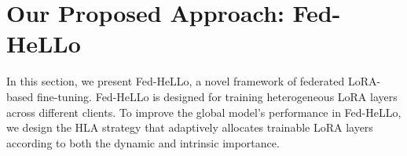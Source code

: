 \documentclass[lettersize,journal]{IEEEtran}
\begin{document}
\section{Our Proposed Approach: Fed-HeLLo}
In this section, we present Fed-HeLLo, a novel framework of federated LoRA-based fine-tuning. 
Fed-HeLLo is designed for training heterogeneous LoRA layers across different clients. 
To improve the global model's performance in Fed-HeLLo, we design the HLA strategy that adaptively allocates trainable LoRA layers according to both the dynamic and intrinsic importance. 
%
%
%
\end{document}
